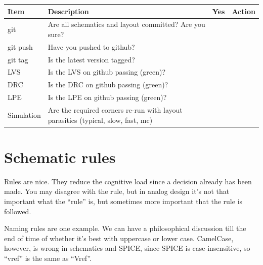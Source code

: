 \begin{longtable}[]{@{}
  >{\raggedright\arraybackslash}p{}
  >{\raggedright\arraybackslash}p{}
  >{\raggedright\arraybackslash}p{}
  >{\raggedright\arraybackslash}p{}@{}}
\toprule\noalign{}
\begin{minipage}[b]{\linewidth}\raggedright
Item
\end{minipage} & \begin{minipage}[b]{\linewidth}\raggedright
Description
\end{minipage} & \begin{minipage}[b]{\linewidth}\raggedright
Yes
\end{minipage} & \begin{minipage}[b]{\linewidth}\raggedright
Action
\end{minipage} \\
\midrule\noalign{}
\endhead
\bottomrule\noalign{}
\endlastfoot
git & Are all schematics and layout committed? Are you sure? & & \\
git push & Have you pushed to github? & & \\
git tag & Is the latest version tagged? & & \\
LVS & Is the LVS on github passing (green)? & & \\
DRC & Is the DRC on github passing (green)? & & \\
LPE & Is the LPE on github passing (green)? & & \\
Simulation & Are the required corners re-run with layout parasitics
(typical, slow, fast, mc) & & \\
\end{longtable}

\section{Schematic rules}\label{schematic-rules}

Rules are nice. They reduce the cognitive load since a decision already
has been made. You may disagree with the rule, but in analog design it's
not that important what the ``rule'' is, but sometimes more important
that the rule is followed.

Naming rules are one example. We can have a philosophical discussion
till the end of time of whether it's best with uppercase or lower case.
CamelCase, however, is wrong in schematics and SPICE, since SPICE is
case-insensitive, so ``vref'' is the same as ``Vref''.

